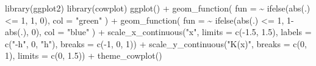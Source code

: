 \documentclass[
  letterpaper,
  DIV=11,
  oneside]{scrreprt}
\newenvironment{Shaded}{\begin{snugshade}}{\end{snugshade}}
\newcommand{\AttributeTok}[1]{\textcolor[rgb]{0.40,0.45,0.13}{#1}}
\newcommand{\DecValTok}[1]{\textcolor[rgb]{0.68,0.00,0.00}{#1}}
\newcommand{\FloatTok}[1]{\textcolor[rgb]{0.68,0.00,0.00}{#1}}
\newcommand{\FunctionTok}[1]{\textcolor[rgb]{0.28,0.35,0.67}{#1}}
\newcommand{\NormalTok}[1]{\textcolor[rgb]{0.00,0.23,0.31}{#1}}
\newcommand{\SpecialCharTok}[1]{\textcolor[rgb]{0.37,0.37,0.37}{#1}}
\newcommand{\StringTok}[1]{\textcolor[rgb]{0.13,0.47,0.30}{#1}}
\begin{document}
\begin{Shaded}
\begin{Highlighting}[]
\FunctionTok{library}\NormalTok{(ggplot2)}
\FunctionTok{library}\NormalTok{(cowplot)}
\FunctionTok{ggplot}\NormalTok{() }\SpecialCharTok{+} 
    \FunctionTok{geom\_function}\NormalTok{(}
      \AttributeTok{fun =} \SpecialCharTok{\textasciitilde{}} \FunctionTok{ifelse}\NormalTok{(}\FunctionTok{abs}\NormalTok{(.) }\SpecialCharTok{\textless{}=} \DecValTok{1}\NormalTok{, }\DecValTok{1}\NormalTok{, }\DecValTok{0}\NormalTok{), }\AttributeTok{col =} \StringTok{"green"}
\NormalTok{      ) }\SpecialCharTok{+} 
    \FunctionTok{geom\_function}\NormalTok{(}
      \AttributeTok{fun =} \SpecialCharTok{\textasciitilde{}} \FunctionTok{ifelse}\NormalTok{(}\FunctionTok{abs}\NormalTok{(.) }\SpecialCharTok{\textless{}=} \DecValTok{1}\NormalTok{, }\DecValTok{1}\SpecialCharTok{{-}}\FunctionTok{abs}\NormalTok{(.), }\DecValTok{0}\NormalTok{), }\AttributeTok{col =} \StringTok{"blue"}
\NormalTok{      ) }\SpecialCharTok{+} 
    \FunctionTok{scale\_x\_continuous}\NormalTok{(}\StringTok{"x"}\NormalTok{, }\AttributeTok{limits =} \FunctionTok{c}\NormalTok{(}\SpecialCharTok{{-}}\FloatTok{1.5}\NormalTok{, }\FloatTok{1.5}\NormalTok{), }
                       \AttributeTok{labels =} \FunctionTok{c}\NormalTok{(}\StringTok{"{-}h"}\NormalTok{, }\DecValTok{0}\NormalTok{, }\StringTok{"h"}\NormalTok{), }
                       \AttributeTok{breaks =} \FunctionTok{c}\NormalTok{(}\SpecialCharTok{{-}}\DecValTok{1}\NormalTok{, }\DecValTok{0}\NormalTok{, }\DecValTok{1}\NormalTok{)) }\SpecialCharTok{+}
    \FunctionTok{scale\_y\_continuous}\NormalTok{(}\StringTok{"K(x)"}\NormalTok{, }
                       \AttributeTok{breaks =} \FunctionTok{c}\NormalTok{(}\DecValTok{0}\NormalTok{, }\DecValTok{1}\NormalTok{), }
                       \AttributeTok{limits =} \FunctionTok{c}\NormalTok{(}\DecValTok{0}\NormalTok{, }\FloatTok{1.5}\NormalTok{)) }\SpecialCharTok{+}
    \FunctionTok{theme\_cowplot}\NormalTok{()}
\end{Highlighting}
\end{Shaded}
\end{document}
